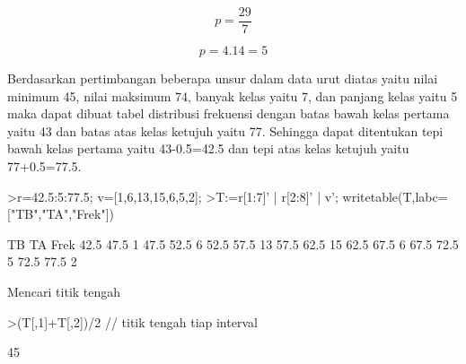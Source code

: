 \documentclass[12pt,arial,letterpaper]{book}
\begin{document}
\begin{eulercomment}
\begin{eulercomment}
\begin{eulercomment}
\begin{eulercomment}
\begin{eulercomment}
\begin{eulercomment}
\begin{eulercomment}
\begin{eulercomment}
\begin{eulercomment}
\begin{eulercomment}
\begin{eulercomment}
\begin{eulercomment}
\begin{eulercomment}
\begin{eulercomment}
\begin{eulercomment}
\begin{eulercomment}
\begin{eulercomment}
\begin{eulercomment}
\begin{eulercomment}
\begin{eulercomment}
\begin{eulercomment}
\begin{eulercomment}
\begin{eulercomment}
\begin{eulercomment}
\begin{eulercomment}
\begin{eulercomment}
\begin{eulercomment}
\begin{eulercomment}
\begin{eulercomment}
\begin{eulercomment}
\begin{eulercomment}
\begin{eulercomment}
\begin{eulercomment}
\begin{eulercomment}
\begin{eulercomment}
\begin{eulercomment}
\begin{eulercomment}
\begin{eulercomment}
\begin{eulerformula}
\end{eulerformula}
\begin{eulerformula}
\[
p=\frac {29}{7}
\]
\end{eulerformula}
\begin{eulerformula}
\[
p= 4.14=5
\]
\end{eulerformula}
\begin{eulercomment}
Berdasarkan pertimbangan beberapa unsur dalam data urut diatas yaitu
nilai minimum 45, nilai maksimum 74, banyak kelas yaitu 7, dan panjang
kelas yaitu 5 maka dapat dibuat tabel distribusi frekuensi dengan
batas bawah kelas pertama yaitu 43 dan batas atas kelas ketujuh yaitu
77. Sehingga dapat ditentukan tepi bawah kelas pertama yaitu
43-0.5=42.5 dan tepi atas kelas ketujuh yaitu 77+0.5=77.5.
\end{eulercomment}
\begin{eulerprompt}
>r=42.5:5:77.5; v=[1,6,13,15,6,5,2];
>T:=r[1:7]' | r[2:8]' | v'; writetable(T,labc=["TB","TA","Frek"])
\end{eulerprompt}
\begin{euleroutput}
          TB        TA      Frek
        42.5      47.5         1
        47.5      52.5         6
        52.5      57.5        13
        57.5      62.5        15
        62.5      67.5         6
        67.5      72.5         5
        72.5      77.5         2
\end{euleroutput}
\begin{eulercomment}
Mencari titik tengah
\end{eulercomment}
\begin{eulerprompt}
>(T[,1]+T[,2])/2 // titik tengah tiap interval
\end{eulerprompt}
\begin{euleroutput}
         45 

\end{euleroutput}
\end{eulercomment}
\end{eulercomment}
\end{eulercomment}
\end{eulercomment}
\end{eulercomment}
\end{eulercomment}
\end{eulercomment}
\end{eulercomment}
\end{eulercomment}
\end{eulercomment}
\end{eulercomment}
\end{eulercomment}
\end{eulercomment}
\end{eulercomment}
\end{eulercomment}
\end{eulercomment}
\end{eulercomment}
\end{eulercomment}
\end{eulercomment}
\end{eulercomment}
\end{eulercomment}
\end{eulercomment}
\end{eulercomment}
\end{eulercomment}
\end{eulercomment}
\end{eulercomment}
\end{eulercomment}
\end{eulercomment}
\end{eulercomment}
\end{eulercomment}
\end{eulercomment}
\end{eulercomment}
\end{eulercomment}
\end{eulercomment}
\end{eulercomment}
\end{eulercomment}
\end{eulercomment}
\end{eulercomment}
\end{document}
